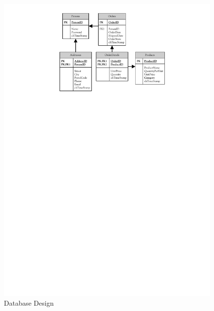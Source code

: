 		\begin{figure}[htb]
			\begin{center}
				\includegraphics{./files/inc/figures/DbDesign}
				\caption{\label{fig:dbDesign}Database Design}
			\end{center}
		\end{figure}

